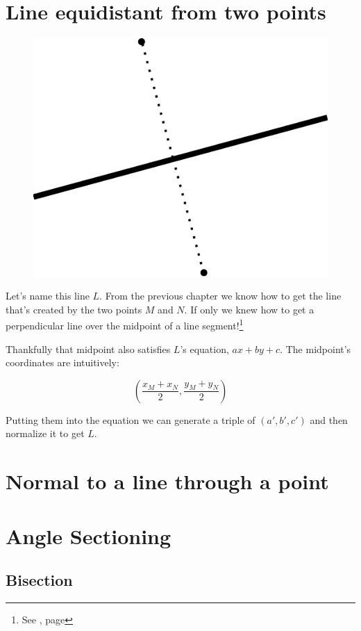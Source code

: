 \documentclass[12pt,openany,a4,usenames,dvipsnames]{book}
\begin{document}
\chapter{Line equidistant from two points}
\begin{figure}[H]
\centering
\includegraphics[height=10\baselineskip,keepaspectratio]{figures/equidistant.pdf}
\end{figure}
Let's name this line $L$. From the previous chapter we know how to get the line that's created by the two points $M$ and $N$. If only we knew how to get a perpendicular line over the midpoint of a line segment!\footnote{See \emph{}, page \pageref{sec:perpendicular}}

Thankfully that midpoint also satisfies $L$'s equation, $ax+by+c$. The midpoint's coordinates are intuitively:

$$ (\frac{x_M + x_N}{2}, \frac{y_M + y_N}{2})$$

Putting them into the equation we can generate a triple of $(a', b', c')$ and then normalize it to get $L$.
\chapter{Normal to a line through a point}
\skelpar%
\chapter{Angle Sectioning}
\section{Bisection}
\end{document}
